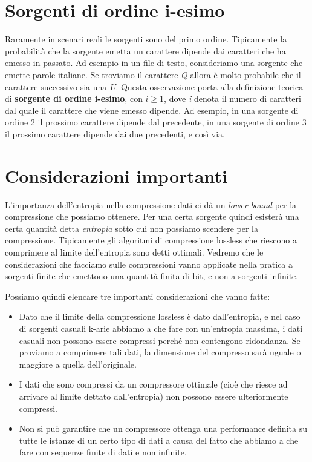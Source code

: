 \section{Sorgenti di ordine i-esimo}
Raramente in scenari reali le sorgenti sono del primo ordine. Tipicamente la probabilità che la sorgente emetta un carattere dipende dai caratteri che ha emesso in passato. Ad esempio in un file di testo, consideriamo una sorgente che emette parole italiane. Se troviamo il carattere \textit{Q} allora è molto probabile che il carattere successivo sia una \textit{U}. Questa osservazione porta alla definizione teorica di \textbf{sorgente di ordine i-esimo}, con \(i \ge 1\), dove \textit{i} denota il numero di caratteri dal quale il carattere che viene emesso dipende. Ad esempio, in una sorgente di ordine 2 il prossimo carattere dipende dal precedente, in una sorgente di ordine 3 il prossimo carattere dipende dai due precedenti, e così via. 


\section{Considerazioni importanti}
L'importanza dell'entropia nella compressione dati ci dà un \textit{lower bound} per la compressione che possiamo ottenere. Per una certa sorgente quindi esisterà una certa quantità detta \textit{entropia} sotto cui non possiamo scendere per la compressione. Tipicamente gli algoritmi di compressione lossless che riescono a comprimere al limite dell'entropia sono detti ottimali. Vedremo che le considerazioni che facciamo sulle compressioni vanno applicate nella pratica a sorgenti finite che emettono una quantità finita di bit, e non a sorgenti infinite.

Possiamo quindi elencare tre importanti considerazioni che vanno fatte:
\begin{itemize}
    \item Dato che il limite della compressione lossless è dato dall'entropia, e nel caso di sorgenti casuali k-arie abbiamo a che fare con un'entropia massima, i dati casuali non possono essere compressi perché non contengono ridondanza. Se proviamo a comprimere tali dati, la dimensione del compresso sarà uguale o maggiore a quella dell'originale.
    \item I dati che sono compressi da un compressore ottimale (cioè che riesce ad arrivare al limite dettato dall'entropia) non possono essere ulteriormente compressi.
    \item Non si può garantire che un compressore ottenga una performance definita su tutte le istanze di un certo tipo di dati a causa del fatto che abbiamo a che fare con sequenze finite di dati e non infinite.
\end{itemize}

\let\cleardoublepage\clearpage